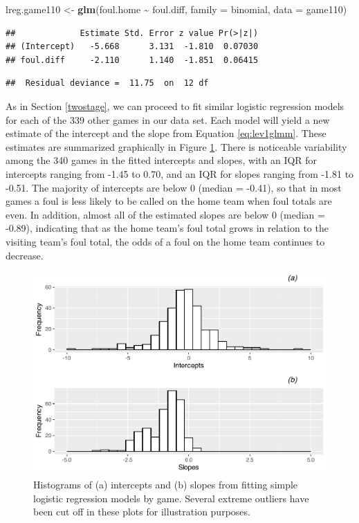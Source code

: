 \documentclass[
]{krantz}
\newenvironment{Shaded}{\begin{snugshade}}{\end{snugshade}}
\newcommand{\AttributeTok}[1]{\textcolor[rgb]{0.27,0.27,0.27}{#1}}
\newcommand{\FunctionTok}[1]{\textcolor[rgb]{0.27,0.27,0.27}{\textbf{#1}}}
\newcommand{\NormalTok}[1]{#1}
\newcommand{\OtherTok}[1]{\textcolor[rgb]{0.37,0.37,0.37}{#1}}
\newcommand{\SpecialCharTok}[1]{\textcolor[rgb]{0.43,0.43,0.43}{\textbf{#1}}}
\begin{document}
\begin{Shaded}
\begin{Highlighting}[]
\NormalTok{lreg.game110 }\OtherTok{\textless{}{-}} \FunctionTok{glm}\NormalTok{(foul.home }\SpecialCharTok{\textasciitilde{}}\NormalTok{ foul.diff, }
                    \AttributeTok{family =}\NormalTok{ binomial, }\AttributeTok{data =}\NormalTok{ game110)}
\end{Highlighting}
\end{Shaded}

\begin{verbatim}
##             Estimate Std. Error z value Pr(>|z|)
## (Intercept)   -5.668      3.131  -1.810  0.07030
## foul.diff     -2.110      1.140  -1.851  0.06415
\end{verbatim}

\begin{verbatim}
##  Residual deviance =  11.75  on  12 df
\end{verbatim}

As in Section \ref{twostage}, we can proceed to fit similar logistic regression models for each of the 339 other games in our data set. Each model will yield a new estimate of the intercept and the slope from Equation \eqref{eq:lev1glmm}. These estimates are summarized graphically in Figure \ref{fig:gmu-histmat2}. There is noticeable variability among the 340 games in the fitted intercepts and slopes, with an IQR for intercepts ranging from -1.45 to 0.70, and an IQR for slopes ranging from -1.81 to -0.51. The majority of intercepts are below 0 (median = -0.41), so that in most games a foul is less likely to be called on the home team when foul totals are even. In addition, almost all of the estimated slopes are below 0 (median = -0.89), indicating that as the home team's foul total grows in relation to the visiting team's foul total, the odds of a foul on the home team continues to decrease.

\begin{figure}

{\centering \includegraphics[width=0.6\linewidth]{bookdown-BeyondMLR_files/figure-latex/gmu-histmat2-1} 

}

\caption{Histograms of (a) intercepts and (b) slopes from fitting simple logistic regression models by game.  Several extreme outliers have been cut off in these plots for illustration purposes.}\label{fig:gmu-histmat2}
\end{figure}
\end{document}
